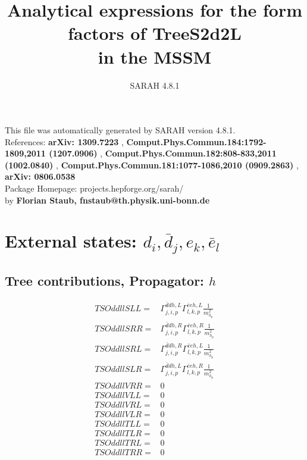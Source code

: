 \documentclass[A4,landscape]{article}
\begin{document}
\title{Analytical expressions for the form factors of TreeS2d2L\\ in the MSSM } 
 \author{SARAH 4.8.1} 
 \maketitle 
 \vspace{10cm} 
This file was automatically generated by SARAH version 4.8.1.  \\ 
References: {\bf arXiv: 1309.7223 }, {\bf Comput.Phys.Commun.184:1792-1809,2011 (1207.0906) }, {\bf Comput.Phys.Commun.182:808-833,2011 (1002.0840) }, {\bf Comput.Phys.Commun.181:1077-1086,2010 (0909.2863) }, {\bf arXiv: 0806.0538 } \\ 
Package Homepage: projects.hepforge.org/sarah/ \\ 
by {\bf Florian Staub, fnstaub@th.physik.uni-bonn.de} 
 \pagebreak 
 \tableofcontents 
 \pagebreak 
\section{External states: ${d_{{i}}, \bar{d}_{{j}}, e_{{k}}, \bar{e}_{{l}}}$} 
\subsection{Tree contributions, Propagator: $h$} 

\begin{align} 
  TSOddllSLL= & \Gamma^{\bar{d}d h ,L}_{j, i, p} \Gamma^{\bar{e}e h ,L}_{l, k, p} \frac{1}{m^2_{h_{{p}}}} \\ 
  TSOddllSRR= & \Gamma^{\bar{d}d h ,R}_{j, i, p} \Gamma^{\bar{e}e h ,R}_{l, k, p} \frac{1}{m^2_{h_{{p}}}} \\ 
  TSOddllSRL= & \Gamma^{\bar{d}d h ,R}_{j, i, p} \Gamma^{\bar{e}e h ,L}_{l, k, p} \frac{1}{m^2_{h_{{p}}}} \\ 
  TSOddllSLR= & \Gamma^{\bar{d}d h ,L}_{j, i, p} \Gamma^{\bar{e}e h ,R}_{l, k, p} \frac{1}{m^2_{h_{{p}}}} \\ 
  TSOddllVRR= & 0 \\ 
  TSOddllVLL= & 0 \\ 
  TSOddllVRL= & 0 \\ 
  TSOddllVLR= & 0 \\ 
  TSOddllTLL= & 0 \\ 
  TSOddllTLR= & 0 \\ 
  TSOddllTRL= & 0 \\ 
  TSOddllTRR= & 0 \\ 
\end{align} 
\end{document}
